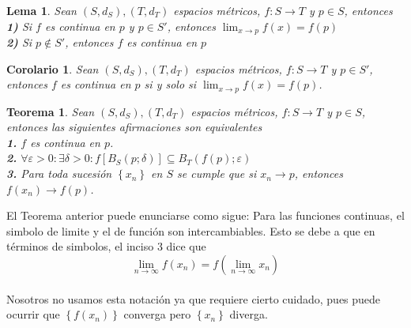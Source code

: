 \documentclass[oneside]{book} %
\theoremstyle{Teorema}
\newtheorem{Teorema}[Definicion]{Teorema}
\newtheorem{Corolario}[Definicion]{Corolario}
\newtheorem{Lema}[Definicion]{Lema}
\theoremstyle{Ejemplos}
\theoremstyle{[Obs]}
\renewcommand{\{}{\left\lbrace} %
\renewcommand{\}}{\right\rbrace} %
\renewcommand{\sc}{\subseteq} %
\begin{document}
			\begin{Lema}
				
				Sean $(S, d_S), (T, d_T)$ espacios métricos, $f : S \to T$ y $p \in S$, entonces \\

				\textbf{1)} Si $f$ es continua en $p$ y $p \in S'$, entonces $\displaystyle\lim_{x \to p} f(x) = f(p)$ \\

				\textbf{2)} Si $p \notin S'$, entonces $f$ es continua en $p$ \\

			\end{Lema}

			\begin{Corolario}
				
				Sean $(S, d_S), (T, d_T)$ espacios métricos, $f : S \to T$ y $p \in S'$, entonces $f$ es continua en $p$ si y solo si $\displaystyle\lim_{x \to p} f(x) = f(p)$. \\

			\end{Corolario}

			\begin{Teorema}
				
				Sean $(S, d_S), (T, d_T)$ espacios métricos, $f : S \to T$ y $p \in S$, entonces las siguientes afirmaciones son equivalentes \\

				\textbf{1.} $f$ es continua en $p$. \\

				\textbf{2.} $\forall \varepsilon > 0 : \exists \delta > 0 : f[B_S(p;\delta)] \sc B_T(f(p);\varepsilon)$ \\

				\textbf{3.} Para toda sucesión $\{ x_n \}$ en $S$ se cumple que si $x_n \to p$, entonces $f(x_n) \to f(p)$. \\

			\end{Teorema}

			El Teorema anterior puede enunciarse como sigue: Para las funciones continuas, el simbolo de limite y el de función son intercambiables. Esto se debe a que en términos de simbolos, el inciso 3 dice que \\

			\[ \lim_{n \to \infty} f(x_n) = f(\lim_{n \to \infty} x_n) \] \\

			Nosotros no usamos esta notación ya que requiere cierto cuidado, pues puede ocurrir que $\{ f(x_n) \}$ converga pero $\{ x_n \}$ diverga. \\
\end{document}
